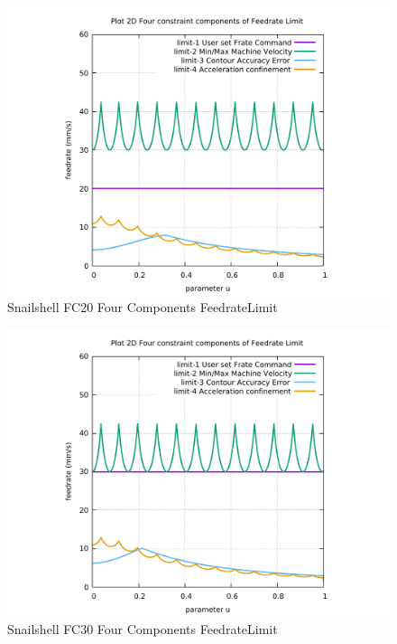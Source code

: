 \begin{figure}
	\caption     {Snailshell FC20 Four Components FeedrateLimit}
	\label{32-img-Snailshell-FC20-Four-Components-FeedrateLimit.pdf}
	\includegraphics[width=1.00\textwidth]{Chap4/appendix/app-Snailshell/plots/32-img-Snailshell-FC20-Four-Components-FeedrateLimit.pdf}
\end{figure}


\clearpage
\pagebreak

\begin{figure}
	\caption     {Snailshell FC30 Four Components FeedrateLimit}
	\label{33-img-Snailshell-FC30-Four-Components-FeedrateLimit.pdf}
	\includegraphics[width=1.00\textwidth]{Chap4/appendix/app-Snailshell/plots/33-img-Snailshell-FC30-Four-Components-FeedrateLimit.pdf}
\end{figure}


